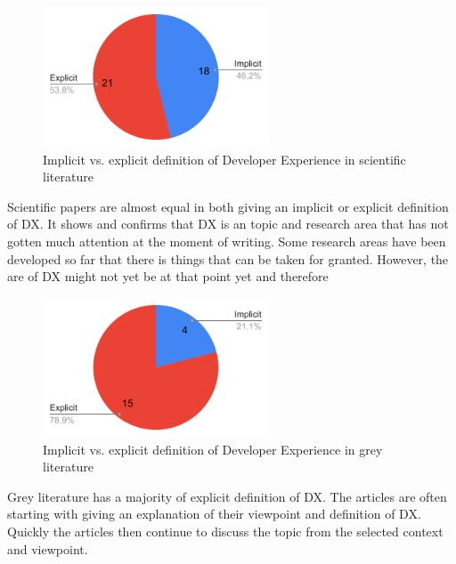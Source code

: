 \documentclass[english, 12pt, a4paper, sci, utf8, a-1b, online]{aaltothesis}
\begin{document}
\begin{figure}[ht]
  \captionsetup{width=0.6\textwidth}
  \caption{Implicit vs. explicit definition of Developer Experience in scientific literature}
  \begin{center}
    \includegraphics[width=0.6\textwidth]{definition-scientific.pdf}
  \end{center}
\end{figure}

Scientific papers are almost equal in both giving an implicit or explicit definition of DX. It shows and confirms that DX is an topic and research area that has not gotten much attention at the moment of writing. Some research areas have been developed so far that there is things that can be taken for granted. However, the are of DX might not yet be at that point yet and therefore

\begin{figure}[ht]
  \captionsetup{width=0.6\textwidth}
  \begin{center}
    \caption{Implicit vs. explicit definition of Developer Experience in grey literature}
    \includegraphics[width=0.6\textwidth]{definition-grey.pdf}
  \end{center}
\end{figure}

Grey literature has a majority of explicit definition of DX. The articles are often starting with giving an explanation of their viewpoint and definition of DX. Quickly the articles then continue to discuss the topic from the selected context and viewpoint.
\end{document}
